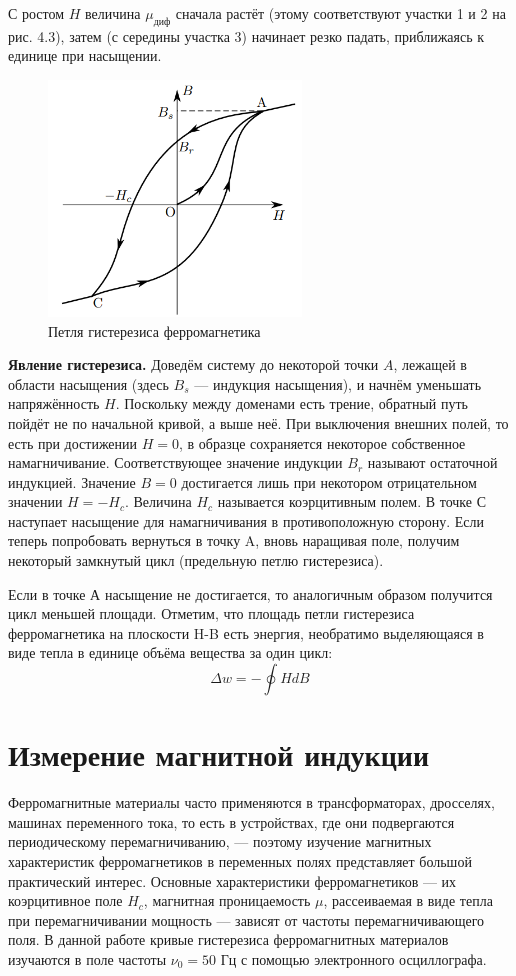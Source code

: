 \documentclass[12pt,a4paper]{article}
\begin{document}
С ростом $H$ величина $\mu_\text{диф}$ сначала растёт (этому соответствуют участки 1 и 2 на рис. 4.3), затем (с середины участка 3) начинает резко падать,
приближаясь к единице при насыщении.
\begin{figure}[h!]
    \centering
    \includegraphics[width=0.6\textwidth]{histeresis_loop_1.png}
    \caption{Петля гистерезиса ферромагнетика}
\end{figure}

\textbf{Явление гистерезиса.}
Доведём систему до некоторой точки $A$, лежащей в области насыщения (здесь $B_s$ — индукция насыщения), и
начнём уменьшать напряжённость $H$. Поскольку между доменами есть
трение, обратный путь пойдёт не по начальной кривой, а выше неё.
При выключения внешних полей, то есть при достижении $H = 0$,
в образце сохраняется некоторое собственное намагничивание. Соответствующее значение индукции $B_r$ называют остаточной индукцией.
Значение $B = 0$ достигается лишь при некотором отрицательном значении $H  = - H_c$. Величина $H_c$ называется коэрцитивным полем. 
В точке С наступает насыщение для намагничивания в противоположную сторону.
Если теперь попробовать вернуться в точку A, вновь наращивая поле, получим некоторый замкнутый цикл (предельную петлю гистерезиса).

Если в точке А насыщение не достигается, то аналогичным
образом получится цикл меньшей площади.
Отметим, что площадь петли гистерезиса ферромагнетика на плоскости H-B есть энергия, необратимо выделяющаяся в виде тепла в еди­нице объёма вещества за один цикл:
\[
\Delta w = - \oint {H dB}
\]
\section{Измерение магнитной индукции}

Ферромагнитные материалы часто применяются в трансформаторах, дросселях, машинах переменного тока, то есть в устройствах, где они подвергаются периодическому перемагничиванию, — поэтому изучение магнитных характеристик ферромагнетиков в переменных полях представляет большой практический интерес. Основные характеристики ферромагнетиков — их коэрцитивное поле $H_c$, магнитная проницаемость $\mu$, рассеиваемая в виде тепла при перемагничивании мощность — зависят от частоты перемагничивающего поля. В данной работе кривые гистерезиса ферромагнитных материалов изучаются в поле частоты $\nu_0 = 50$ Гц с помощью электронного осциллографа.
\end{document}
